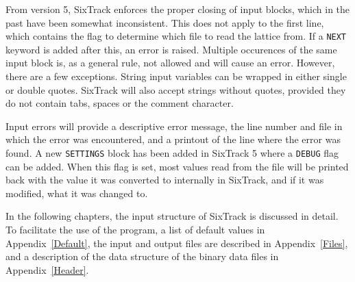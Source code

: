 From version 5, SixTrack enforces the proper closing of input blocks, which in the past have been somewhat inconsistent.
This does not apply to the first line, which contains the flag to determine which file to read the lattice from.
If a \texttt{NEXT} keyword is added after this, an error is raised.
Multiple occurences of the same input block is, as a general rule, not allowed and will cause an error.
However, there are a few exceptions.
String input variables can be wrapped in either single or double quotes.
SixTrack will also accept strings without quotes, provided they do not contain tabs, spaces or the comment character.

Input errors will provide a descriptive error message, the line number and file in which the error was encountered, and a printout of the line where the error was found.
A new \texttt{SETTINGS} block has been added in SixTrack 5 where a \texttt{DEBUG} flag can be added.
When this flag is set, most values read from the file will be printed back with the value it was converted to internally in SixTrack, and if it was modified, what it was changed to.

In the following chapters, the input structure of SixTrack is discussed in detail.
To facilitate the use of the program, a list of default values in Appendix~\ref{Default}, the input and output files are described in Appendix~\ref{Files}, and a description of the data structure of the binary data files in Appendix~\ref{Header}.
